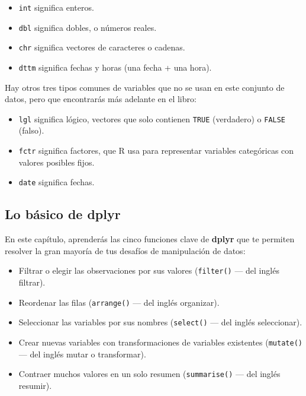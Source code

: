 \documentclass[11pt,oneside]{report}
\providecommand{\tightlist}{%
  \setlength{\itemsep}{0pt}\setlength{\parskip}{0pt}}
\begin{document}
\begin{itemize}
\item
  \texttt{int} significa enteros.
\item
  \texttt{dbl} significa dobles, o números reales.
\item
  \texttt{chr} significa vectores de caracteres o cadenas.
\item
  \texttt{dttm} significa fechas y horas (una fecha + una hora).
\end{itemize}

Hay otros tres tipos comunes de variables que no se usan en este
conjunto de datos, pero que encontrarás más adelante en el libro:

\begin{itemize}
\item
  \texttt{lgl} significa lógico, vectores que solo contienen
  \texttt{TRUE} (verdadero) o \texttt{FALSE} (falso).
\item
  \texttt{fctr} significa factores, que R usa para representar variables
  categóricas con valores posibles fijos.
\item
  \texttt{date} significa fechas.
\end{itemize}

\hypertarget{lo-buxe1sico-de-dplyr}{%
\subsection{\texorpdfstring{Lo básico de
\textbf{dplyr}}{Lo básico de dplyr}}\label{lo-buxe1sico-de-dplyr}}

En este capítulo, aprenderás las cinco funciones clave de \textbf{dplyr}
que te permiten resolver la gran mayoría de tus desafíos de manipulación
de datos:

\begin{itemize}
\tightlist
\item
  Filtrar o elegir las observaciones por sus valores (\texttt{filter()}
  --- del inglés filtrar).
\item
  Reordenar las filas (\texttt{arrange()} --- del inglés organizar).
\item
  Seleccionar las variables por sus nombres (\texttt{select()} --- del
  inglés seleccionar).
\item
  Crear nuevas variables con transformaciones de variables existentes
  (\texttt{mutate()} --- del inglés mutar o transformar).
\item
  Contraer muchos valores en un solo resumen (\texttt{summarise()} ---
  del inglés resumir).
\end{itemize}
\end{document}
